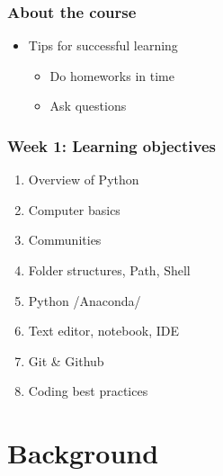 \documentclass{beamer}
\begin{document}
\begin{frame}
    \frametitle{About the course} %
    \begin{itemize}
        \item Tips for successful learning
            \begin{itemize}
                \item Do homeworks in time
                \item Ask questions
            \end{itemize}
    \end{itemize}        
    \end{frame}


\begin{frame}
    \frametitle{Week 1: Learning objectives}
    \begin{enumerate}
        \item Overview of Python 
        \item Computer basics
        \item Communities
        \item Folder structures, Path, Shell
        \item Python /Anaconda/
        \item Text editor, notebook, IDE
        \item Git \& Github
        \item Coding best practices
    \end{enumerate}
\end{frame}

\section{Background} 
\frame{\tableofcontents[currentsection]}
\end{document}
